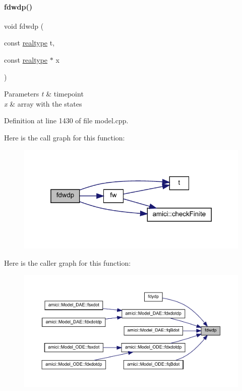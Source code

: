 \paragraph{\texorpdfstring{fdwdp()}{fdwdp()}\hspace{0.1cm}{\footnotesize\ttfamily [1/2]}}
{\footnotesize\ttfamily void fdwdp (\begin{DoxyParamCaption}\item[{const \mbox{\hyperlink{namespaceamici_a1bdce28051d6a53868f7ccbf5f2c14a3}{realtype}}}]{t,  }\item[{const \mbox{\hyperlink{namespaceamici_a1bdce28051d6a53868f7ccbf5f2c14a3}{realtype}} $\ast$}]{x }\end{DoxyParamCaption})}


\begin{DoxyParams}{Parameters}
{\em t} & timepoint \\
\hline
{\em x} & array with the states \\
\hline
\end{DoxyParams}


Definition at line 1430 of file model.\+cpp.

Here is the call graph for this function\+:
\nopagebreak
\begin{figure}[H]
\begin{center}
\leavevmode
\includegraphics[width=319pt]{classamici_1_1_model_a7a8903313cd31dad4fa580c0e434bb1c_cgraph}
\end{center}
\end{figure}
Here is the caller graph for this function\+:
\nopagebreak
\begin{figure}[H]
\begin{center}
\leavevmode
\includegraphics[width=350pt]{classamici_1_1_model_a7a8903313cd31dad4fa580c0e434bb1c_icgraph}
\end{center}
\end{figure}
\mbox{\label{classamici_1_1_model_a29b16aa0c3fb0254fb248c003473d5f9}} 
